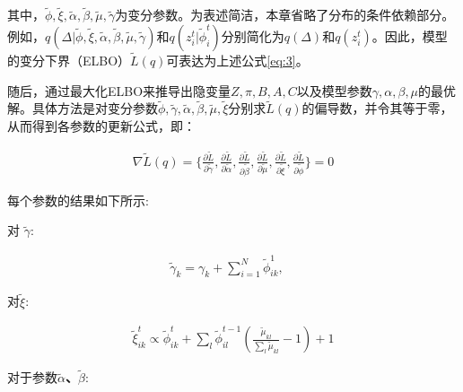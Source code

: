 其中，$\widetilde{\phi}, \widetilde{\xi}, \widetilde{\alpha}, \widetilde{\beta}, \widetilde{\mu}, \widetilde{\gamma}$为变分参数。为表述简洁，本章省略了分布的条件依赖部分。例如，$q(\Delta|\widetilde{\phi},\widetilde{\xi},\widetilde{\alpha},\widetilde{\beta},\widetilde{\mu},\widetilde{\gamma})$和$q(z_i^t|\widetilde{\phi}_i^t)$分别简化为$q(\Delta)$和$q(z_i^t)$。因此，模型的变分下界（ELBO）$\widetilde{L}(q)$可表达为上述公式\ref{eq:3}。

随后，通过最大化ELBO来推导出隐变量$Z, \pi, B, A, C$以及模型参数$\gamma, \alpha, \beta, \mu$的最优解。具体方法是对变分参数$\widetilde{\phi}, \widetilde{\gamma}, \widetilde{\alpha}, \widetilde{\beta}, \widetilde{\mu}, \widetilde{\xi}$分别求$\widetilde{L}(q)$的偏导数，并令其等于零，从而得到各参数的更新公式，即：

\begin{equation}
\begin{split}
\nabla \widetilde{L}(q) = \{ \frac{\partial \widetilde{L}}{\partial \widetilde{\gamma}}, \frac{\partial \widetilde{L}}{\partial \widetilde{\alpha}}, \frac{\partial \widetilde{L}}{\partial \widetilde{\beta}}, \frac{\partial \widetilde{L}}{\partial \widetilde{\mu}}, \frac{\partial \widetilde{L}}{\partial \widetilde{\xi}}, \frac{\partial \widetilde{L}}{\partial \widetilde{\phi}} \} = 0
\end{split}
\end{equation}

每个参数的结果如下所示:

对\textbf{ $\widetilde{\gamma}$}:

\begin{equation}
\label{eq4}
\begin{split}
\widetilde{\gamma}_k = \gamma_k + \sum_{i=1}^N \widetilde{\phi}_{ik}^1, \quad
\end{split}
\end{equation}

对\textbf{$\widetilde{\xi}$}:

\begin{equation}
\label{eq5}
\begin{split}
\widetilde{\xi}_{ik}^t \propto \widetilde{\phi}_{ik}^t + \sum_l \widetilde{\phi}_{il}^{t-1}(\frac{\widetilde{\mu}_{kl}}{\sum_l \widetilde{\mu}_{kl}} - 1) + 1
\end{split}
\end{equation}

对于参数\textbf{$\widetilde{\alpha}$、$\widetilde{\beta}$}:

